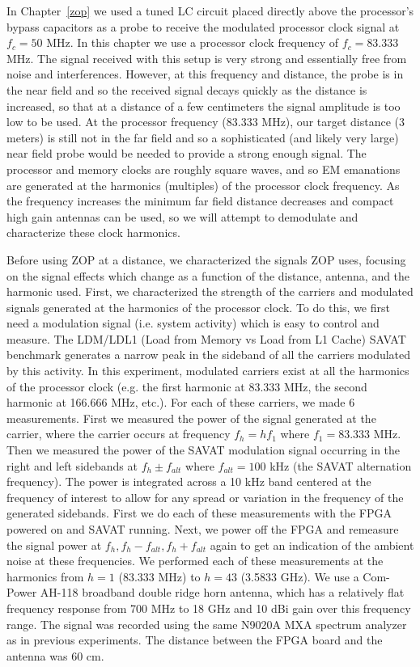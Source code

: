 In Chapter~\ref{zop} we used a tuned LC circuit placed directly above the processor's bypass capacitors as a probe to receive the modulated processor clock signal at $f_c = 50$ MHz. In this chapter we use a processor clock frequency of $f_c = 83.333$ MHz. The signal received with this setup is very strong and essentially free from noise and interferences. However, at this frequency and distance, the probe is in the near field and so the received signal decays quickly as the distance is increased, so that at a distance of a few centimeters the signal amplitude is too low to be used. At the processor frequency (83.333 MHz), our target distance (3 meters) is still not in the far field and so a sophisticated (and likely very large) near field probe would be needed to provide a strong enough signal. The processor and memory clocks are roughly square waves, and so EM emanations are generated at the harmonics (multiples) of the processor clock frequency. As the frequency increases the minimum far field distance decreases and compact high gain antennas can be used, so we will attempt to demodulate and characterize these clock harmonics. 

Before using ZOP at a distance, we characterized the signals ZOP uses, focusing on the signal effects which change as a function of the distance, antenna, and the harmonic used. First, we characterized the strength of the carriers and modulated signals generated at the harmonics of the processor clock. To do this, we first need a modulation signal (i.e. system activity) which is easy to control and measure. The LDM/LDL1 (Load from Memory vs Load from L1 Cache) SAVAT benchmark generates a narrow peak in the sideband of all the carriers modulated by this activity. In this experiment, modulated carriers exist at all the harmonics of the processor clock (e.g. the first harmonic at 83.333 MHz, the second harmonic at 166.666 MHz, etc.). For each of these carriers, we made 6 measurements. First we measured the power of the signal generated at the carrier, where the carrier occurs at frequency $f_h = h f_1$ where $f_1 = 83.333$ MHz. Then we measured the power of the SAVAT modulation signal occurring in the right and left sidebands at $f_h \pm f_{alt}$ where $f_{alt} = 100$ kHz (the SAVAT alternation frequency). The power is integrated across a 10 kHz band centered at the frequency of interest to allow for any spread or variation in the frequency of the generated sidebands. First we do each of these measurements with the FPGA powered on and SAVAT running. Next, we power off the FPGA and remeasure the signal power at $f_h, f_h - f_{alt}, f_h + f_{alt}$ again to get an indication of the ambient noise at these frequencies. We performed each of these measurements at the harmonics from $h = 1$ (83.333 MHz) to $h = 43$ (3.5833 GHz). We use a Com-Power AH-118 broadband double ridge horn antenna, which has a relatively flat frequency response from 700 MHz to 18 GHz and 10 dBi gain over this frequency range. The signal was recorded using the same N9020A MXA spectrum analyzer as in previous experiments. The distance between the FPGA board and the antenna was 60 cm.

